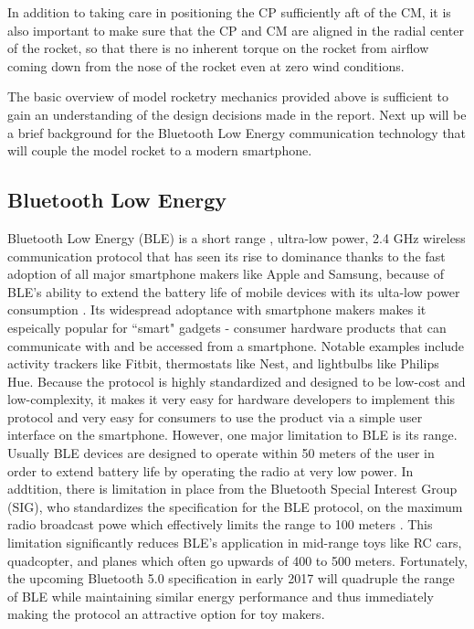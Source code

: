 \documentclass{workreport}
\begin{document}
\begin{body}
	In addition to taking care in positioning the CP sufficiently aft of the CM, it is also important to make sure that the CP and CM are aligned in the radial center of the rocket, so that there is no inherent torque on the rocket from airflow coming down from the nose of the rocket even at zero wind conditions.

	The basic overview of model rocketry mechanics provided above is sufficient to gain an understanding of the design decisions made in the report. Next up will be a brief background for the Bluetooth Low Energy communication technology that will couple the model rocket to a modern smartphone.

\subsection{Bluetooth Low Energy}
	Bluetooth Low Energy (BLE) is a short range , ultra-low power, 2.4 GHz wireless communication protocol that has seen its rise to dominance thanks to the fast adoption of all major smartphone makers like Apple and Samsung, because of BLE's ability to extend the battery life of mobile devices with its ulta-low power consumption \cite{k_townsend_ble}. Its widespread adoptance with smartphone makers makes it espeically popular for ``smart" gadgets - consumer hardware products that can communicate with and be accessed from a smartphone. Notable examples include activity trackers like Fitbit, thermostats like Nest, and lightbulbs like Philips Hue. Because the protocol is highly standardized and designed to be low-cost and low-complexity, it makes it very easy for hardware developers to implement this protocol and very easy for consumers to use the product via a simple user interface on the smartphone. However, one major limitation to BLE is its range. Usually BLE devices are designed to operate within 50 meters of the user in order to extend battery life by operating the radio at very low power. In addtition, there is limitation in place from the Bluetooth Special Interest Group (SIG), who standardizes the specification for the BLE protocol, on the maximum radio broadcast powe which effectively limits the range to 100 meters \cite{k_townsend_ble}. This limitation significantly reduces BLE's application in mid-range toys like RC cars, quadcopter, and planes which often go upwards of 400 to 500 meters. Fortunately, the upcoming Bluetooth 5.0 specification in early 2017 will quadruple the range of BLE while maintaining similar energy performance and thus immediately making the protocol an attractive option for toy makers.


\end{body}
\end{document}
